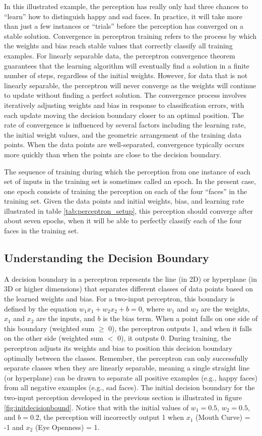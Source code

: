 In this illustrated example, the perception has really only had three chances to ``learn'' how to distinguish happy and sad faces.  In practice, it will take more than just a few instances or ``trials'' before the perception has converged on a stable solution.  Convergence in perceptron training refers to the process by which the weights and bias reach stable values that correctly classify all training examples. For linearly separable data, the perceptron convergence theorem guarantees that the learning algorithm will eventually find a solution in a finite number of steps, regardless of the initial weights. However, for data that is not linearly separable, the perceptron will never converge as the weights will continue to update without finding a perfect solution. The convergence process involves iteratively adjusting weights and bias in response to classification errors, with each update moving the decision boundary closer to an optimal position. The rate of convergence is influenced by several factors including the learning rate, the initial weight values, and the geometric arrangement of the training data points. When the data points are well-separated, convergence typically occurs more quickly than when the points are close to the decision boundary. 

The sequence of training during which the perception from one instance of each set of inputs in the training set is sometimes called an epoch.  In the present case, one epoch consists of training the perception on each of the four ``faces'' in the training set. Given the data points and initial weights, bias, and learning rate illustrated in table \ref{tab:perceptron_setup}, this perception should converge after about seven epochs, when it will be able to perfectly classify each of the four faces in the training set. 

\subsection{Understanding the Decision Boundary}
A decision boundary in a perceptron represents the line (in 2D) or hyperplane (in 3D or higher dimensions) that separates different classes of data points based on the learned weights and bias. For a two-input perceptron, this boundary is defined by the equation $w_1x_1 + w_2x_2 + b = 0$, where $w_1$ and $w_2$ are the weights, $x_1$ and $x_2$ are the inputs, and $b$ is the bias term. When a point falls on one side of this boundary (weighted sum $\geq$ 0), the perceptron outputs 1, and when it falls on the other side (weighted sum $<$ 0), it outputs 0. During training, the perceptron adjusts its weights and bias to position this decision boundary optimally between the classes. Remember, the perceptron can only successfully separate classes when they are linearly separable, meaning a single straight line (or hyperplane) can be drawn to separate all positive examples (e.g., happy faces) from all negative examples (e.g., sad faces).  The initial decision boundary for the two-input perception developed in the previous section is illustrated in figure \ref{fig:initdecisionbound}.  Notice that with the initial values of $w_1=0.5$, $w_2=0.5$, and $b=0.2$, the perception will incorrectly output 1 when $x_1$ (Mouth Curve) = -1 and $x_2$ (Eye Openness) = 1.

